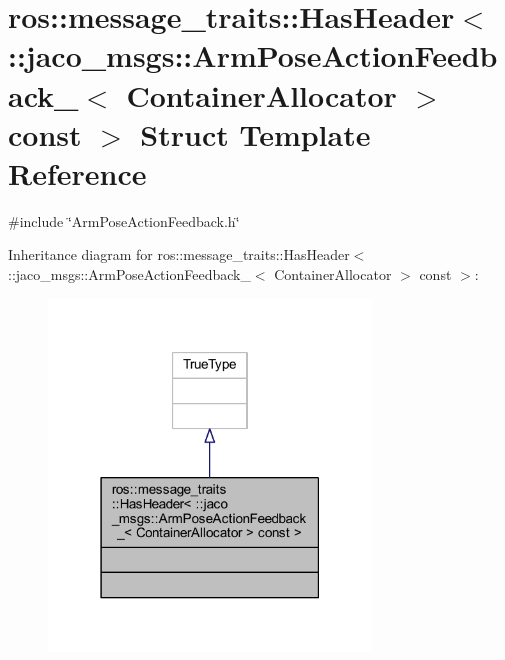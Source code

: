 \hypertarget{structros_1_1message__traits_1_1HasHeader_3_01_1_1jaco__msgs_1_1ArmPoseActionFeedback___3_01Cont492d204a40f4f5fba98e8ab4dc137540}{}\section{ros\+:\+:message\+\_\+traits\+:\+:Has\+Header$<$ \+:\+:jaco\+\_\+msgs\+:\+:Arm\+Pose\+Action\+Feedback\+\_\+$<$ Container\+Allocator $>$ const $>$ Struct Template Reference}
\label{structros_1_1message__traits_1_1HasHeader_3_01_1_1jaco__msgs_1_1ArmPoseActionFeedback___3_01Cont492d204a40f4f5fba98e8ab4dc137540}


{\ttfamily \#include \char`\"{}Arm\+Pose\+Action\+Feedback.\+h\char`\"{}}



Inheritance diagram for ros\+:\+:message\+\_\+traits\+:\+:Has\+Header$<$ \+:\+:jaco\+\_\+msgs\+:\+:Arm\+Pose\+Action\+Feedback\+\_\+$<$ Container\+Allocator $>$ const $>$\+:
\nopagebreak
\begin{figure}[H]
\begin{center}
\leavevmode
\includegraphics[width=243pt]{d5/d58/structros_1_1message__traits_1_1HasHeader_3_01_1_1jaco__msgs_1_1ArmPoseActionFeedback___3_01Contb4f18adf7ebb78413edad9c8fc2a6d1d}
\end{center}
\end{figure}


